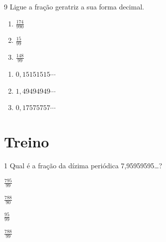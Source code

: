 \num{9} Ligue a fração geratriz a sua forma decimal. 

\begin{multicols}{2}
\begin{enumerate}[label=(\alph*)]
\item $\frac{174}{990}$  
\item $\frac{15}{99}$ 
\item $\frac{148}{99}$ 
\end{enumerate}
\begin{enumerate}[label=(\quad)]
\item $0,15151515\cdots{}$  
\item $1,49494949\cdots{}$  
\item $0,17575757\cdots{}$  
\end{enumerate}
\end{multicols}


\section*{Treino}

\num{1} Qual é a fração da dízima periódica 7,95959595\ldots?


\begin{multicols}{4}
\begin{escolha}[itemsep=0pt]
\item $\frac{795}{99}$
\item $\frac{788}{90}$
\item $\frac{95}{99}$
\item $\frac{788}{99}$
\end{escolha}
\end{multicols}

